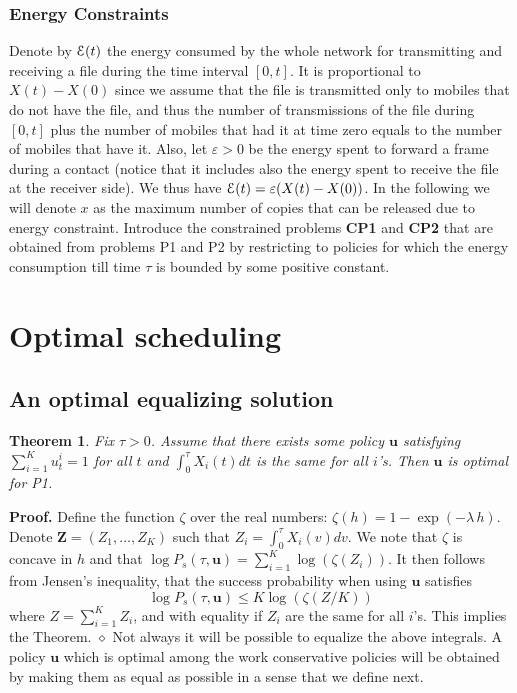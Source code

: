 \documentclass[10pt,twocolumn,conference,final]{IEEEtran}
\def\endpf{\hfill$\diamond$}
\newtheorem{thm}{Theorem}[section]
\newcommand{\Z}{\mathbf Z}
\newcommand{\ubf}{\mathbf u}
\begin{document}
\subsubsection*{Energy Constraints}
Denote by $ {\cal E} (t) $ the
energy consumed by the whole network
for transmitting and receiving a file during
the time interval $[0,t]$. It is proportional to
$X(t) - X(0)$ since we assume that the file is transmitted only to mobiles that
do not have the file, and thus the number of transmissions
of the file during $[0,t]$ plus the number of mobiles that had it at time zero
equals to the number of mobiles that have it.
Also, let $\varepsilon>0$ be the energy spent to forward a frame
during a contact (notice that it includes also the energy spent
to receive the file at the receiver side).
We thus have $ { \cal E}(t) = \varepsilon (X(t) - X(0))$. In the following
we will denote $x$ as the maximum number of copies that can be released due
to energy constraint.
Introduce the constrained problems {\bf CP1} and {\bf CP2} that are
obtained from problems P1 and P2 by restricting to policies
for which the energy consumption till time $\tau$ is bounded
by some positive constant.\section{Optimal scheduling}\label{sec:wc}
\subsection{An optimal equalizing solution}
\begin{thm}\label{thm:equalization}
Fix $\tau>0$.
Assume that there exists some policy $\ubf$ satisfying
$\sum_{i=1}^K u_t^i = 1 $ for all $t$ and
$\int_0^\tau X_i(t) dt $ is the same for all $i$'s.
Then $\ubf$ is optimal for P1.
\end{thm}
\bigskip
{\bf Proof.}
Define the function $\zeta$ over the real numbers:
\(
\zeta(h) = 1-\exp(-\lambda\,  h  ) .
\)
Denote $\Z=(Z_1,\ldots,Z_K)$ such that
\(
Z_i = \int_0^\tau X_i(v)dv .
\)
We note that $\zeta$ is concave in $ h $ and that
\(
\log P_s(\tau ,\ubf)= \sum_{i=1}^K \log(\zeta ( Z_i )) .
\)
It then follows from Jensen's inequality, that
the success probability when using $ \ubf $ satisfies
\begin{equation}\label{log}
\log P_s(\tau , \ubf )
\leq K \log\left(\zeta \left( {Z}/{K} \right)\right)
\end{equation}
where $Z=\sum_{i=1}^K Z_i$, and with equality if $ Z_i $ are the same for all $i$'s.
This implies the Theorem.
\endpf
\bigskip
Not always it will be possible to equalize the above integrals.
A policy $\ubf$ which is optimal among the work conservative policies will
be obtained by making them as equal as possible in a sense that we define next.
\end{document}
